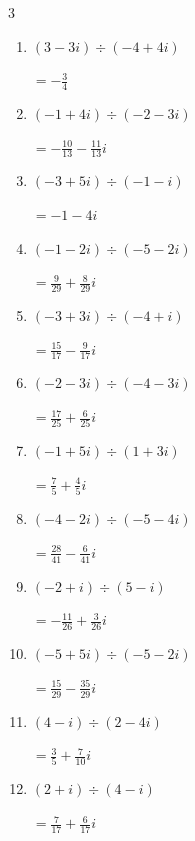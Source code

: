 \begin{multicols}{3}
\begin{enumerate}
  \item $\displaystyle (3-3i)\div(-4+4i)$

        $\displaystyle =-\frac{3}{4}$

  \item $\displaystyle (-1+4i)\div(-2-3i)$

        $\displaystyle =-\frac{10}{13}-\frac{11}{13}i$

\columnbreak %

  \item $\displaystyle (-3+5i)\div(-1-i)$

        $\displaystyle =-1-4i$

  \item $\displaystyle (-1-2i)\div(-5-2i)$

        $\displaystyle =\frac{9}{29}+\frac{8}{29}i$

  \item $\displaystyle (-3+3i)\div(-4+i)$

        $\displaystyle =\frac{15}{17}-\frac{9}{17}i$

  \item $\displaystyle (-2-3i)\div(-4-3i)$

        $\displaystyle =\frac{17}{25}+\frac{6}{25}i$

  \item $\displaystyle (-1+5i)\div(1+3i)$

        $\displaystyle =\frac{7}{5}+\frac{4}{5}i$

  \item $\displaystyle (-4-2i)\div(-5-4i)$

        $\displaystyle =\frac{28}{41}-\frac{6}{41}i$

  \item $\displaystyle (-2+i)\div(5-i)$

        $\displaystyle =-\frac{11}{26}+\frac{3}{26}i$

  \item $\displaystyle (-5+5i)\div(-5-2i)$

        $\displaystyle =\frac{15}{29}-\frac{35}{29}i$

  \item $\displaystyle (4-i)\div(2-4i)$

        $\displaystyle =\frac{3}{5}+\frac{7}{10}i$

  \item $\displaystyle (2+i)\div(4-i)$

        $\displaystyle =\frac{7}{17}+\frac{6}{17}i$


\end{enumerate}
\end{multicols}
